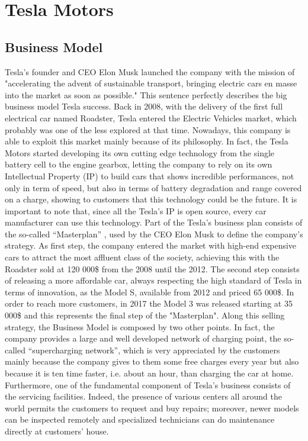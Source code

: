 \section{Tesla Motors}

\subsection{Business Model}
Tesla's founder and CEO Elon Musk launched the company with the mission of "accelerating the advent of sustainable transport, bringing electric cars en masse into the market as soon as possible." This sentence perfectly describes the big business model Tesla success.
Back in 2008, with the delivery of the first full electrical car named Roadster, Tesla entered the Electric Vehicles market, which probably was one of the less explored at that time.  
Nowadays, this company is able to exploit this market mainly because of its philosophy. In fact, the Tesla Motors started developing its own cutting edge technology from the single battery cell to the engine gearbox, letting the company to rely on its own Intellectual Property (IP) to build cars that shows incredible performances, not only in term of speed, but also in terms of battery degradation and range covered on a charge, showing to customers that this technology could be the future. 
It is important to note that, since all the Tesla’s IP is open source, every car manufacturer can use this technology.
Part of the Tesla’s business plan consists of the so-called “Masterplan” \cite{TeslaMasterplan}, used by the CEO Elon Musk to define the company’s strategy. As first step, the company entered the market with high-end expensive cars to attract the most affluent class of the society, achieving this with the Roadster sold at 120 000\$ from the 2008 until the 2012. The second step consists of releasing a more affordable car, always respecting the high standard of Tesla in terms of innovation, as the Model S, available from 2012 and priced 65 000\$. In order to reach more customers, in 2017 the Model 3 was released starting at 35 000\$ and this represents the final step of the "Masterplan".
Along this selling strategy, the Business Model is composed by two other points.
In fact, the company provides a large and well developed network of charging point, the so-called “supercharging network”, which is very appreciated by the customers mainly because the company gives to them some free charges every year but also because it is ten time faster, i.e. about an hour, than charging the car at home.
Furthermore, one of the fundamental component of Tesla's business consists of the servicing facilities. Indeed, the presence of various centers all around the world permits the customers to request and buy repairs; moreover, newer models can be inspected remotely and specialized technicians can do maintenance directly at customers' house.

